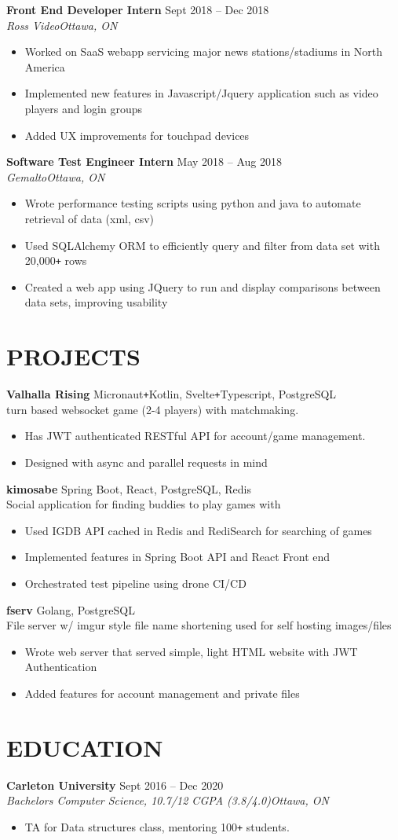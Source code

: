\documentclass[letterpaper]{article}
\newcommand{\NewPart}[1]{\section*{\uppercase{\large\textbf{#1}}}}
\newcommand{\DatedEntry}[5]{\large\textbf{#1}
	\hfill \small#2\\
	\textit{#3}\hfill\textit{#4}\\\vspace{0.1cm}
	#5\vspace{0.1cm}
}
\newcommand{\ProjectEntry}[4]{\large\textbf{#1}
	\hfill \small{#2}\\
	#3\\\vspace{0.1cm}
	#4\vspace{0.1cm}
}
\begin{document}
\DatedEntry{Front End Developer Intern}
{Sept 2018 -- Dec 2018}
{Ross Video}
{Ottawa, ON}
{\begin{itemize}[nolistsep]
	\item Worked on SaaS webapp servicing major news stations/stadiums in North America
	\item Implemented new features in Javascript/Jquery application such as video players and login groups
	\item Added UX improvements for touchpad devices
\end{itemize}}
\DatedEntry{Software Test Engineer Intern}
{May 2018 -- Aug 2018}
{Gemalto}
{Ottawa, ON}
{\begin{itemize}[nolistsep]
	\item Wrote performance testing scripts using python and java to automate retrieval of data (xml, csv)
	\item Used SQLAlchemy ORM to efficiently query and filter from data set with 20,000\texttt{+} rows
	\item Created a web app using JQuery to run and display comparisons between data sets, improving usability
\end{itemize}}\vspace{-0.3cm}

\NewPart{Projects}{}
\ProjectEntry{Valhalla Rising}
{Micronaut\texttt{+}Kotlin, Svelte\texttt{+}Typescript, PostgreSQL}
{turn based websocket game (2-4 players) with matchmaking.}
{\begin{itemize}
	\item Has JWT authenticated RESTful API for account/game management.
	\item Designed with async and parallel requests in mind
\end{itemize}}
\ProjectEntry{kimosabe}
{Spring Boot, React, PostgreSQL, Redis}
{Social application for finding buddies to play games with}
{\begin{itemize}
	\item Used IGDB API cached in Redis and RediSearch for searching of games
	\item Implemented features in Spring Boot API and React Front end
	\item Orchestrated test pipeline using drone CI/CD
\end{itemize}}
\ProjectEntry{fserv}
{Golang, PostgreSQL}
{File server w/ imgur style file name shortening used for self hosting images/files}
{\begin{itemize}
	\item Wrote web server that served simple, light HTML website with JWT Authentication
	\item Added features for account management and private files
\end{itemize}}\vspace{-0.3cm}

\NewPart{Education}{}
\DatedEntry{Carleton University}
{Sept 2016 -- Dec 2020}
{Bachelors Computer Science, 10.7/12 CGPA (3.8/4.0)}
{Ottawa, ON}
{\begin{itemize}
	\item TA for Data structures class, mentoring 100\texttt{+} students.
\end{itemize}}
\end{document}
